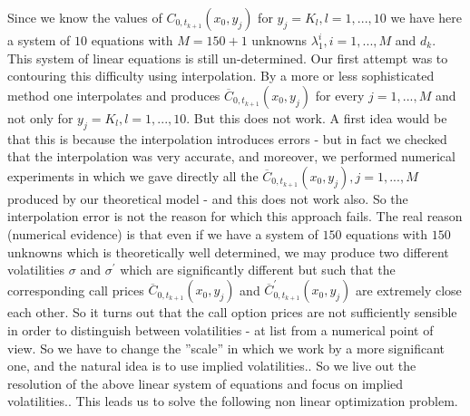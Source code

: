 \documentclass[a4paper]{article}
\begin{document}
Since we know the values of $C_{0,t_{k+1}}(x_{0},y_{j})$ for $%
y_{j}=K_{l},l=1,...,10$ we have here a system of $10$ equations with $%
M=150+1 $ unknowns $\lambda _{1}^{i},i=1,...,M$ and $d_{k}.$ This system of
linear equations is still un-determined. Our first attempt was to contouring
this difficulty using interpolation. By a more or less sophisticated method
one interpolates and produces $\overline{C}_{0,t_{k+1}}(x_{0},y_{j})$ for
every $j=1,...,M$ and not only for $y_{j}=K_{l},l=1,...,10.$ But this does
not work. A first idea would be that this is because the interpolation
introduces errors - but in fact we checked that the interpolation was very
accurate, and moreover, we performed numerical experiments in which we gave
directly all the $\overline{C}_{0,t_{k+1}}(x_{0},y_{j}),j=1,...,M$ produced
by our theoretical model - and this does not work also. So the interpolation
error is not the reason for which this approach fails. The real reason
(numerical evidence) is that even if we have a system of $150$ equations
with $150$ unknowns which is theoretically well determined, we may produce
two different volatilities $\sigma $ and $\sigma ^{\prime }$ which are
significantly different but such that the corresponding call prices $%
\overline{C}_{0,t_{k+1}}(x_{0},y_{j})$ and $\overline{C}_{0,t_{k+1}}^{\prime
}(x_{0},y_{j})$ are extremely close each other. So it turns out that the
call option prices are not sufficiently sensible in order to distinguish
between volatilities - at list from a numerical point of view. So we have to
change the ''scale'' in which we work by a more significant one, and the
natural idea is to use implied volatilities.. So we live out the resolution
of the above linear system of equations and focus on implied volatilities..
This leads us to solve the following non linear optimization problem.
\end{document}
